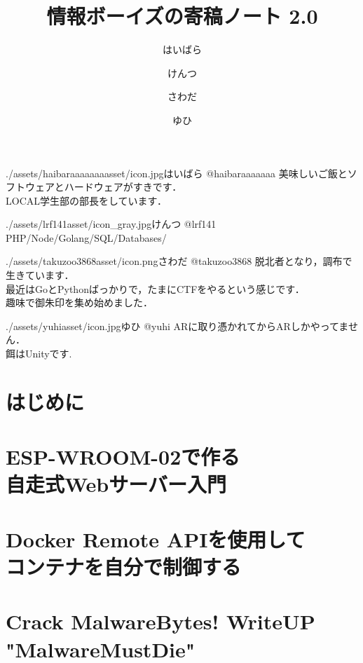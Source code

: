 \documentclass[autodetect-engine,dvipdfmx-if-dvi,ja=standard,b5paper,10.5pt,twoside,openany,layout=v2]{bxjsbook}
\title{情報ボーイズの寄稿ノート 2.0}
\author{はいばら \and けんつ \and さわだ \and ゆひ}
\date{}
\newcommand{\articlepath}{./articles}
\newcommand{\assetspath}{./assets}
\newcommand{\lrfasset}{\assetspath/lrf141asset}
\newcommand{\haibaraaaaaaaasset}{\assetspath/haibaraaaaaaaasset}
\newcommand{\yuhiasset}{\assetspath/yuhiasset}
\newcommand{\takuzooasset}{\assetspath/takuzoo3868asset}
\begin{document}
\frontmatter
\maketitle
\begin{myintroduce}{\haibaraaaaaaaasset/icon.jpg}{はいばら @haibaraaaaaaa}
  美味しいご飯とソフトウェアとハードウェアがすきです．\\
  LOCAL学生部の部長をしています．
\end{myintroduce}
\begin{myintroduce}{\lrfasset/icon_gray.jpg}{けんつ @lrf141}
  PHP/Node/Golang/SQL/Databases/
\end{myintroduce}
\begin{myintroduce}{\takuzooasset/icon.png}{さわだ @takuzoo3868}
脱北者となり，調布で生きています． \\
最近はGoとPythonばっかりで，たまにCTFをやるという感じです． \\
趣味で御朱印を集め始めました．
\end{myintroduce}
\begin{myintroduce}{\yuhiasset/icon.jpg}{ゆひ @yuhi}
ARに取り憑かれてからARしかやってません． \\
餌はUnityです.
\end{myintroduce}

\chapter{はじめに}
\addtolength{\oddsidemargin}{10pt}
\addtolength{\evensidemargin}{-10pt}


\tableofcontents
\mainmatter

\chapter{ESP-WROOM-02で作る \\自走式Webサーバー入門}


\chapter{Docker Remote APIを使用して\\コンテナを自分で制御する}


\chapter{Crack MalwareBytes! WriteUP "MalwareMustDie"}

\end{document}
